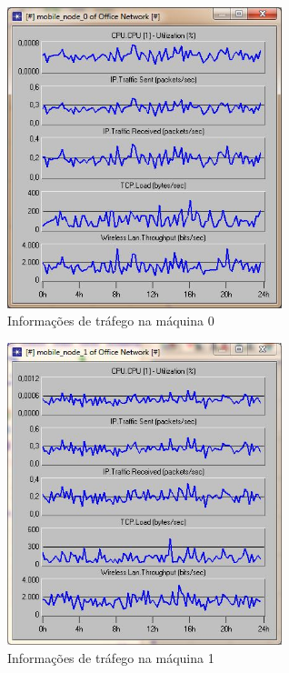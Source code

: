 \documentclass[brazil,times,12pt]{abnt}
\begin{document}
\begin{figure}[H]
\begin{center}
  \includegraphics[width=80mm]{SimulacaoRede/Maquina0.jpg}
  \caption[trafego-maquina0]{Informações de tráfego na máquina 0}
  \label{trafego-maquina0}
\end{center}
\end{figure}

\begin{figure}[H]
\begin{center}
  \includegraphics[width=80mm]{SimulacaoRede/Maquina1.jpg}
  \caption[trafego-maquina1]{Informações de tráfego na máquina 1}
  \label{trafego-maquina1}
\end{center}
\end{figure}
\end{document}
